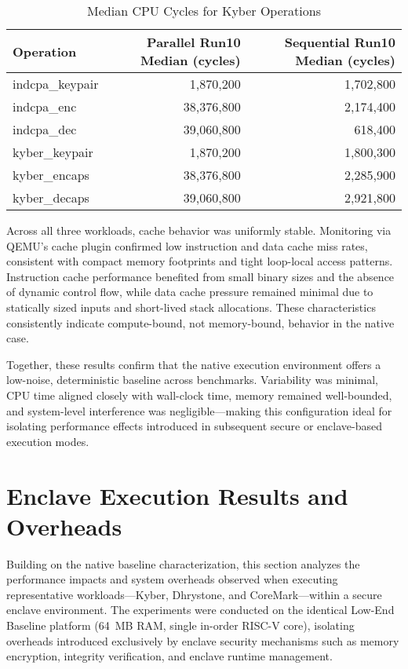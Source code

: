 \begin{table}[H]
\centering
\scriptsize
\caption{Median CPU Cycles for Kyber Operations}
\begin{tabular}{|l|r|r|}
\hline
\textbf{Operation} & \textbf{Parallel Run10 Median (cycles)} & \textbf{Sequential Run10 Median (cycles)} \\
\hline
indcpa\_keypair & 1,870,200 & 1,702,800 \\
\hline
indcpa\_enc     & 38,376,800 & 2,174,400 \\
\hline
indcpa\_dec     & 39,060,800 & 618,400 \\
\hline
kyber\_keypair  & 1,870,200 & 1,800,300 \\
\hline
kyber\_encaps   & 38,376,800 & 2,285,900 \\
\hline
kyber\_decaps   & 39,060,800 & 2,921,800 \\
\hline
\end{tabular}
\label{tab:kyber_median_cycles}
\end{table}

Across all three workloads, cache behavior was uniformly stable. Monitoring via QEMU’s cache plugin confirmed low instruction and data cache miss rates, consistent with compact memory footprints and tight loop-local access patterns. Instruction cache performance benefited from small binary sizes and the absence of dynamic control flow, while data cache pressure remained minimal due to statically sized inputs and short-lived stack allocations. These characteristics consistently indicate compute-bound, not memory-bound, behavior in the native case.

Together, these results confirm that the native execution environment offers a low-noise, deterministic baseline across benchmarks. Variability was minimal, CPU time aligned closely with wall-clock time, memory remained well-bounded, and system-level interference was negligible—making this configuration ideal for isolating performance effects introduced in subsequent secure or enclave-based execution modes.

\section{Enclave Execution Results and Overheads}
\label{sec:enclave-execution}

Building on the native baseline characterization, this section analyzes the performance impacts and system overheads observed when executing representative workloads—Kyber, Dhrystone, and CoreMark—within a secure enclave environment. The experiments were conducted on the identical Low-End Baseline platform (64~MB RAM, single in-order RISC-V core), isolating overheads introduced exclusively by enclave security mechanisms such as memory encryption, integrity verification, and enclave runtime management.

